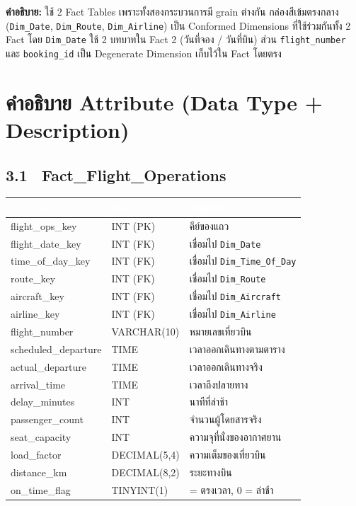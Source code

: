 \documentclass[11pt]{article}
\makeatletter
\newcommand{\code}[1]{\texttt{#1}}
\newcommand{\atthead}{\rowcolor{tblHead}
  \textcolor{white}{\textbf{Attribute}} & \textcolor{white}{\textbf{Data Type}} & \textcolor{white}{\textbf{คำอธิบาย}}\\}
\newenvironment{atttable}[1]%
  {\subsection*{#1}\vspace{-4pt}
   \begin{tabular}{@{}>{\ttfamily\small}p{4.3cm} >{\small}p{2.7cm} >{\small\raggedright\arraybackslash}p{9.4cm}@{}}
   \toprule\atthead \midrule}%
  {\bottomrule\end{tabular}\vspace{3pt}}
\makeatother
\begin{document}
\vspace{2pt}
\noindent\small
\textbf{คำอธิบาย:} ใช้ 2 Fact Tables เพราะทั้งสองกระบวนการมี grain ต่างกัน
กล่องสีเข้มตรงกลาง (\mbox{\code{Dim_Date}}, \mbox{\code{Dim_Route}}, \mbox{\code{Dim_Airline}}) เป็น Conformed Dimensions
ที่ใช้ร่วมกันทั้ง 2 Fact โดย \code{Dim_Date} ใช้ 2 บทบาทใน Fact 2 (วันที่จอง / วันที่บิน)
ส่วน \code{flight_number} และ \code{booking_id} เป็น Degenerate Dimension เก็บไว้ใน Fact โดยตรง
\normalsize

\clearpage
\section{คำอธิบาย Attribute (Data Type + Description)}

\begin{atttable}{3.1 \ Fact_Flight_Operations}
flight_ops_key      & INT (PK)      & คีย์ของแถว\\
flight_date_key     & INT (FK)      & เชื่อมไป \code{Dim_Date} \\
time_of_day_key     & INT (FK)      & เชื่อมไป \code{Dim_Time_Of_Day} \\
route_key           & INT (FK)      & เชื่อมไป \code{Dim_Route}\\
aircraft_key        & INT (FK)      & เชื่อมไป \code{Dim_Aircraft}\\
airline_key         & INT (FK)      & เชื่อมไป \code{Dim_Airline}\\
flight_number       & VARCHAR(10)   & หมายเลขเที่ยวบิน\\
scheduled_departure & TIME          & เวลาออกเดินทางตามตาราง\\
actual_departure    & TIME          & เวลาออกเดินทางจริง\\
arrival_time        & TIME          & เวลาถึงปลายทาง\\
delay_minutes       & INT           & นาทีที่ล่าช้า\\
passenger_count     & INT           & จำนวนผู้โดยสารจริง\\
seat_capacity       & INT           & ความจุที่นั่งของอากาศยาน\\
load_factor         & DECIMAL(5,4)  & ความเต็มของเที่ยวบิน\\
distance_km         & DECIMAL(8,2)  & ระยะทางบิน \\
on_time_flag        & TINYINT(1)    & 1 = ตรงเวลา, 0 = ล่าช้า\\
\end{atttable}
\end{document}
